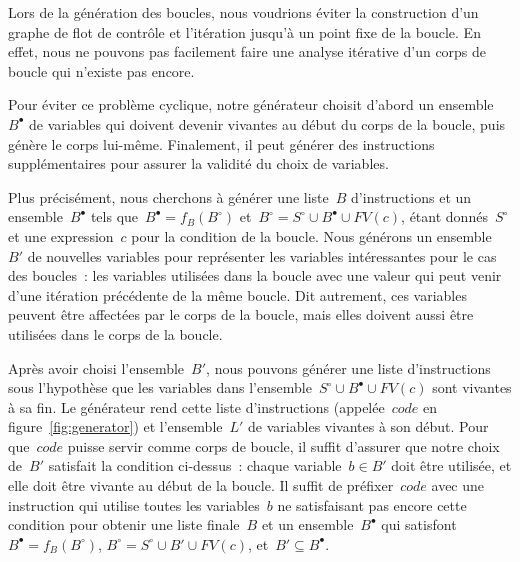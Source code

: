 \documentclass[a4paper]{easychair}
\newcommand{\liveout}[1]{\ensuremath{#1^{\circ}}}
\newcommand{\livein}[1]{\ensuremath{#1^{\bullet}}}
\def\union{\cup}
\begin{document}
Lors de la génération des boucles, nous voudrions éviter la construction
d'un graphe de flot de contrôle et l'itération jusqu'à un point fixe de la
boucle. En effet, nous ne pouvons pas facilement faire une analyse itérative
d'un corps de boucle qui n'existe pas encore.


Pour éviter ce problème cyclique, notre générateur choisit d'abord un
ensemble~\(\livein{B}\) de variables qui doivent devenir vivantes au
début du corps de la boucle, puis génère le corps
lui-même. Finalement, il peut générer des instructions supplémentaires
pour assurer la validité du choix de variables.


Plus précisément, nous cherchons à générer une liste~\(B\) d'instructions et
un ensemble~\(\livein{B}\) tels que~\(\livein{B} = f_B(\liveout{B})\)
et~\(\liveout{B} = \liveout{S} \union \livein{B} \union FV(c)\), étant
donnés~\(\liveout{S}\) et une expression~\(c\) pour la condition de la
boucle. Nous générons un ensemble~\(B'\) de nouvelles variables pour
représenter les variables intéressantes pour le cas des boucles~: les
variables utilisées dans la boucle avec une valeur qui peut venir d'une
itération précédente de la même boucle. Dit autrement, ces variables peuvent
être affectées par le corps de la boucle, mais elles doivent aussi être utilisées
dans le corps de la boucle.

Après avoir choisi l'ensemble~\(B'\), nous pouvons générer une liste
d'instructions sous l'hypothèse que les variables dans
l'ensemble~\(\liveout{S} \union \livein{B} \union FV(c)\) sont vivantes à sa
fin.
Le générateur rend cette liste d'instructions (appelée~\(code\) en
figure~\ref{fig:generator}) et l'ensemble~\(L'\) de variables vivantes à son
début. Pour que~\(code\) puisse servir comme corps de boucle, il suffit
d'assurer que notre choix de~\(B'\) satisfait la condition ci-dessus~:
chaque variable~\(b \in B'\) doit être utilisée, et elle doit être vivante
au début de la boucle. Il suffit de préfixer~\(code\) avec une instruction
qui utilise toutes les variables~\(b\) ne satisfaisant pas encore cette condition pour
obtenir une liste finale~\(B\) et un ensemble~\(\livein{B}\) qui satisfont
\(\livein{B} = f_B(\liveout{B})\), \(\liveout{B} = \liveout{S} \union B'
\union FV(c)\), et~\(B' \subseteq \livein{B}\).
\end{document}

